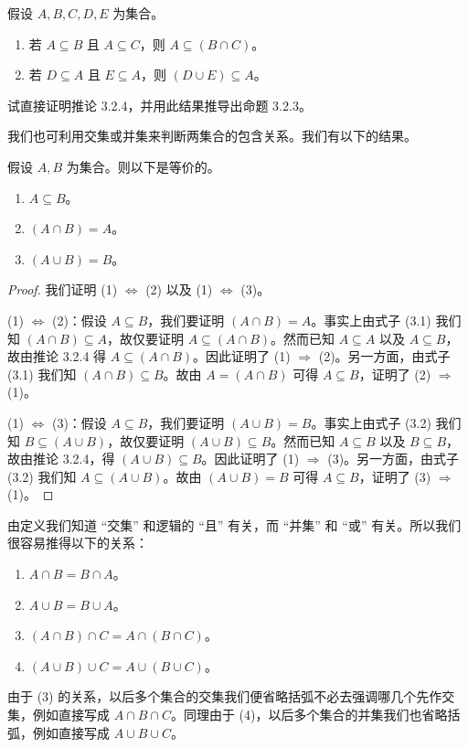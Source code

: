 \begin{corollary}
假设 $A, B, C, D, E$ 为集合。
\begin{enumerate}
  \item 若 $A \subseteq B$ 且 $A \subseteq C$，则 $A \subseteq (B \cap C)$。
  \item 若 $D \subseteq A$ 且 $E \subseteq A$，则 $(D \cup E) \subseteq A$。
\end{enumerate}
\end{corollary}

\begin{question}
试直接证明推论 3.2.4，并用此结果推导出命题 3.2.3。
\end{question}

我们也可利用交集或并集来判断两集合的包含关系。我们有以下的结果。

\begin{proposition}
假设 $A, B$ 为集合。则以下是等价的。
\begin{enumerate}[label={(\arabic*)}]
  \item $A \subseteq B$。
  \item $(A \cap B) = A$。
  \item $(A \cup B) = B$。
\end{enumerate}
\end{proposition}

\begin{proof}
我们证明 (1) $\Leftrightarrow$ (2) 以及 (1) $\Leftrightarrow$ (3)。

(1) $\Leftrightarrow$ (2)：假设 $A \subseteq B$，我们要证明 $(A \cap B) = A$。事实上由式子 (3.1) 我们知 $(A \cap B) \subseteq A$，故仅要证明 $A \subseteq (A \cap B)$。然而已知 $A \subseteq A$ 以及 $A \subseteq B$，故由推论 3.2.4 得 $A \subseteq (A \cap B)$。因此证明了 (1) $\Rightarrow$ (2)。另一方面，由式子 (3.1) 我们知 $(A \cap B) \subseteq B$。故由 $A = (A \cap B)$ 可得 $A \subseteq B$，证明了 (2) $\Rightarrow$ (1)。

(1) $\Leftrightarrow$ (3)：假设 $A \subseteq B$，我们要证明 $(A \cup B) = B$。事实上由式子 (3.2) 我们知 $B \subseteq (A \cup B)$，故仅要证明 $(A \cup B) \subseteq B$。然而已知 $A \subseteq B$ 以及 $B \subseteq B$，故由推论 3.2.4，得 $(A \cup B) \subseteq B$。因此证明了 (1) $\Rightarrow$ (3)。另一方面，由式子 (3.2) 我们知 $A \subseteq (A \cup B)$。故由 $(A \cup B) = B$ 可得 $A \subseteq B$，证明了 (3) $\Rightarrow$ (1)。
\end{proof}

由定义我们知道 “交集” 和逻辑的 “且” 有关，而 “并集” 和 “或” 有关。所以我们很容易推得以下的关系：
\begin{enumerate}[label={(\arabic*)}]
  \item $A \cap B = B \cap A$。
  \item $A \cup B = B \cup A$。
  \item $(A \cap B) \cap C = A \cap (B \cap C)$。
  \item $(A \cup B) \cup C = A \cup (B \cup C)$。
\end{enumerate}
由于 (3) 的关系，以后多个集合的交集我们便省略括弧不必去强调哪几个先作交集，例如直接写成 $A \cap B \cap C$。同理由于 (4)，以后多个集合的并集我们也省略括弧，例如直接写成 $A \cup B \cup C$。

